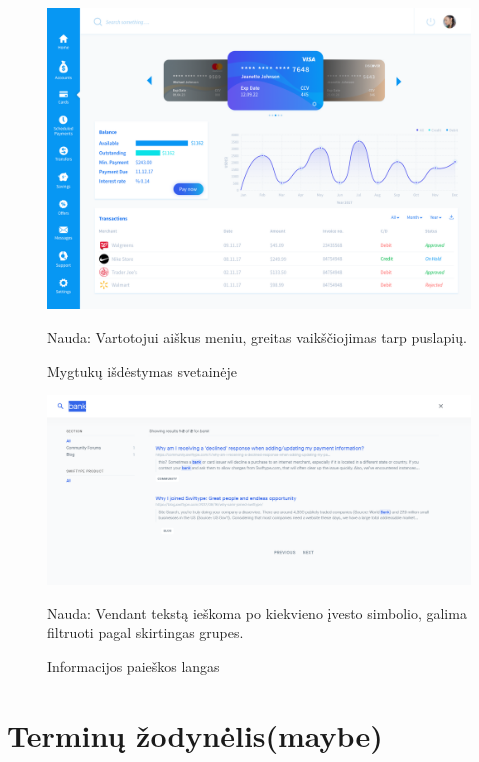 \documentclass{VUMIFPSkursinis}
\begin{document}
\begin{figure}[!htb]
  \includegraphics[width=\linewidth]{iconPlacement.png}
  \caption{Mygtukų išdėstymas svetainėje}
	\label{fig:iconPlacement}
	Nauda: Vartotojui aiškus meniu, greitas vaikščiojimas tarp puslapių.
\end{figure}
\begin{figure}[!htb]
  \includegraphics[width=\linewidth]{SearchWindow.png}
  \caption{Informacijos paieškos langas}
	\label{fig:searchWindow}
	Nauda: Vendant tekstą ieškoma po kiekvieno įvesto simbolio, galima filtruoti pagal skirtingas grupes.
\end{figure}
\section{Terminų žodynėlis(maybe)}
\end{document}

